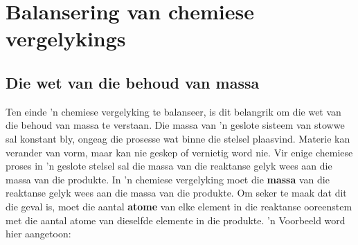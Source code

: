   \label{m38721**end}
         \section{Balansering van chemiese vergelykings}
    \nopagebreak


            \subsection*{Die wet van die behoud van massa}
            \nopagebreak
Ten einde 'n chemiese vergelyking te balanseer, is dit belangrik om die wet van die behoud van massa te verstaan.
 {Die massa van 'n geslote sisteem van stowwe sal konstant bly, ongeag die prosesse wat binne die stelsel plaasvind. Materie kan verander van vorm, maar kan nie geskep of vernietig word nie. Vir enige chemiese proses in 'n geslote stelsel sal die massa van die reaktanse  gelyk wees aan die massa van die produkte. } 
In 'n chemiese vergelyking moet die \textbf{massa} van die reaktanse gelyk wees aan die massa van die produkte. Om seker te maak dat dit die geval is, moet die aantal \textbf{atome} van elke element in die reaktanse ooreenstem met die aantal atome van dieselfde elemente in die produkte.  'n Voorbeeld word hier aangetoon:
